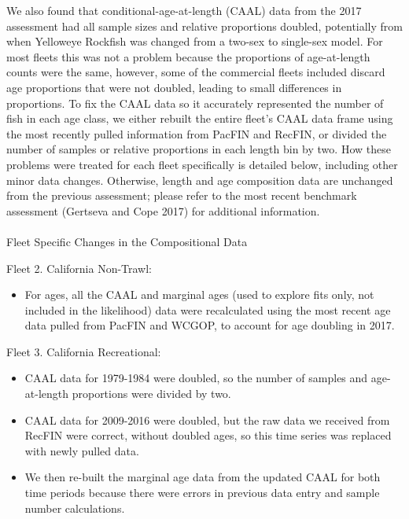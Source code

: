 \documentclass[
]{scrartcl}
\makeatletter
\let\oldparagraph\paragraph
\renewcommand{\paragraph}{
    \@ifstar
      \xxxParagraphStar
      \xxxParagraphNoStar
  }
\newcommand{\xxxParagraphStar}[1]{\oldparagraph*{#1}\mbox{}}
\newcommand{\xxxParagraphNoStar}[1]{\oldparagraph{#1}\mbox{}}
\providecommand{\tightlist}{%
  \setlength{\itemsep}{0pt}\setlength{\parskip}{0pt}}\usepackage{longtable,booktabs,array}
\makeatother
\begin{document}
We also found that conditional-age-at-length (CAAL) data from the 2017
assessment had all sample sizes and relative proportions doubled,
potentially from when Yelloweye Rockfish was changed from a two-sex to
single-sex model. For most fleets this was not a problem because the
proportions of age-at-length counts were the same, however, some of the
commercial fleets included discard age proportions that were not
doubled, leading to small differences in proportions. To fix the CAAL
data so it accurately represented the number of fish in each age class,
we either rebuilt the entire fleet's CAAL data frame using the most
recently pulled information from PacFIN and RecFIN, or divided the
number of samples or relative proportions in each length bin by two. How
these problems were treated for each fleet specifically is detailed
below, including other minor data changes. Otherwise, length and age
composition data are unchanged from the previous assessment; please
refer to the most recent benchmark assessment (Gertseva and Cope 2017)
for additional information.

\paragraph{Fleet Specific Changes in the Compositional
Data}\label{fleet-specific-changes-in-the-compositional-data}

Fleet 2. California Non-Trawl:

\begin{itemize}
\tightlist
\item
  For ages, all the CAAL and marginal ages (used to explore fits only,
  not included in the likelihood) data were recalculated using the most
  recent age data pulled from PacFIN and WCGOP, to account for age
  doubling in 2017.
\end{itemize}

Fleet 3. California Recreational:

\begin{itemize}
\tightlist
\item
  CAAL data for 1979-1984 were doubled, so the number of samples and
  age-at-length proportions were divided by two.
\item
  CAAL data for 2009-2016 were doubled, but the raw data we received
  from RecFIN were correct, without doubled ages, so this time series
  was replaced with newly pulled data.
\item
  We then re-built the marginal age data from the updated CAAL for both
  time periods because there were errors in previous data entry and
  sample number calculations.
\end{itemize}
\end{document}
